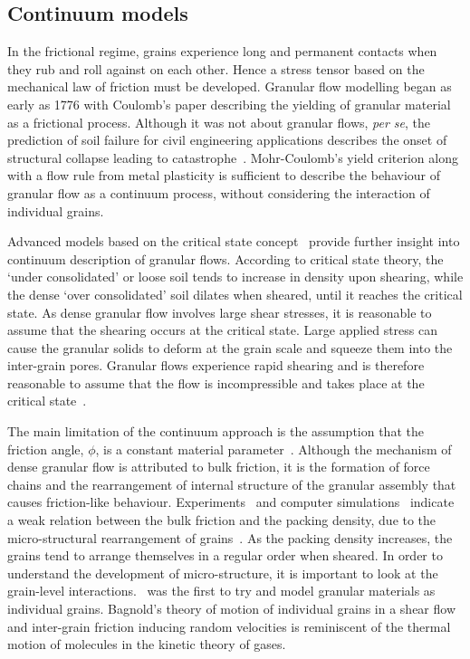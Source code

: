 \subsection{Continuum models}

In the frictional regime, grains experience long and permanent contacts when 
they rub and roll against on each other. Hence a stress tensor based on the 
mechanical law of friction must be developed. Granular flow modelling began as 
early as 1776 with Coulomb's paper describing the yielding of granular material 
as a frictional process. Although it was not about granular flows, \textit{per 
se}, the prediction of 
soil failure for civil engineering applications describes the onset of 
structural collapse leading to catastrophe~\citep{Campbell2006}. Mohr-Coulomb's 
yield criterion along with a flow rule from metal plasticity is sufficient to 
describe the behaviour of granular flow as a continuum process, without 
considering the interaction of individual grains.

Advanced models based on the critical state concept~\citep{Schofield1968} 
provide further insight into 
continuum description of granular flows. According to critical state 
theory, the `under consolidated' or loose soil tends to increase in density 
upon shearing, while the dense `over consolidated' soil dilates when sheared, 
until it reaches the critical state. As dense granular flow involves large 
shear stresses, it is reasonable to assume that the shearing occurs at the 
critical state. Large applied stress can cause the granular solids to deform 
at the grain scale and squeeze them into the inter-grain pores. Granular flows 
experience rapid shearing and is therefore reasonable to assume that the flow 
is incompressible and takes place at the critical state~\citep{Campbell2006}. 


The main limitation of the continuum approach is the assumption that the 
friction angle, $\phi$, is a constant material parameter~\citep{Potapov1996}. 
Although the mechanism of dense granular flow is 
attributed to bulk friction, it is the formation of force chains and the 
rearrangement of internal structure of the granular assembly that causes 
friction-like behaviour. Experiments~\citep{Savage1984,Savage1984a} and 
computer simulations~\citep{Campbell1985} indicate a weak relation between the 
bulk friction and the packing density, due to the micro-structural 
rearrangement of grains~\citep{Campbell1986}. As the packing density 
increases, the grains tend to arrange themselves in a regular order when 
sheared. In order to understand the development of micro-structure, it is 
important to look at the grain-level interactions.~\citet{Bagnold1954} was 
the first to try and model granular materials as individual grains. 
Bagnold's theory of motion of individual grains in a shear flow and 
inter-grain friction inducing random velocities is reminiscent of the 
thermal motion of molecules in the kinetic theory of gases. 

